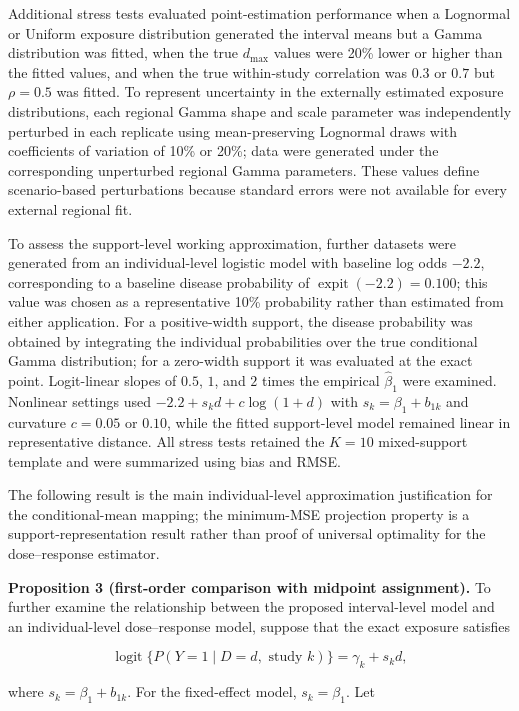 \documentclass[journal=rsm]{CUP-JNL-DTM}%
\theoremstyle{definition}
\numberwithin{equation}{section}
\begin{document}
Additional stress tests evaluated point-estimation performance when a Lognormal or Uniform exposure distribution generated the interval means but a Gamma distribution was fitted, when the true $d_{\max}$ values were 20\% lower or higher than the fitted values, and when the true within-study correlation was $0.3$ or $0.7$ but $\rho=0.5$ was fitted. To represent uncertainty in the externally estimated exposure distributions, each regional Gamma shape and scale parameter was independently perturbed in each replicate using mean-preserving Lognormal draws with coefficients of variation of 10\% or 20\%; data were generated under the corresponding unperturbed regional Gamma parameters. These values define scenario-based perturbations because standard errors were not available for every external regional fit.

To assess the support-level working approximation, further datasets were generated from an individual-level logistic model with baseline log odds $-2.2$, corresponding to a baseline disease probability of $\operatorname{expit}(-2.2)=0.100$; this value was chosen as a representative 10\% probability rather than estimated from either application. For a positive-width support, the disease probability was obtained by integrating the individual probabilities over the true conditional Gamma distribution; for a zero-width support it was evaluated at the exact point. Logit-linear slopes of $0.5$, $1$, and $2$ times the empirical $\hat\beta_1$ were examined. Nonlinear settings used $-2.2+s_kd+c\log(1+d)$ with $s_k=\beta_1+b_{1k}$ and curvature $c=0.05$ or $0.10$, while the fitted support-level model remained linear in representative distance. All stress tests retained the $K=10$ mixed-support template and were summarized using bias and RMSE.

The following result is the main individual-level approximation justification
for the conditional-mean mapping; the minimum-MSE projection property is a
support-representation result rather than proof of universal optimality for
the dose--response estimator.

\noindent\textbf{Proposition 3 (first-order comparison with midpoint assignment).}
To further examine the relationship between the proposed interval-level model
and an individual-level dose--response model, suppose that the exact exposure
satisfies

\[
\operatorname{logit}\{P(Y=1\mid D=d,\text{ study }k)\}
=
\gamma_k+s_kd,
\]

where $s_k=\beta_1+b_{1k}$. For the fixed-effect model,
$s_k=\beta_1$. Let
\end{document}
